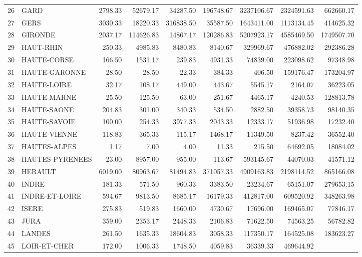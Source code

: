 \documentclass[11pt, a4paper]{article}
\begin{document}
\begin{center}
\begin{table}[ht]
\begin{tabular}{rlrrrrrrr}
  26 & GARD & 2798.33 & 52679.17 & 34287.50 & 196748.67 & 3237106.67 & 2324591.63 
& 662660.17 \\ 
  27 & GERS & 3030.33 & 18220.33 & 316838.50 & 35587.50 & 1643411.00 & 1113134.45 
& 414625.32 \\ 
  28 & GIRONDE & 2037.17 & 114626.83 & 14867.17 & 120286.83 & 5207923.17 & 4585469.50 & 1749507.70 \\ 
  29 & HAUT-RHIN & 250.33 & 4985.83 & 8480.83 & 8140.67 & 329969.67 & 476882.02 & 
292386.28 \\ 
  30 & HAUTE-CORSE & 166.50 & 1531.17 & 239.83 & 4931.33 & 74839.00 & 223098.62 & 
97348.98 \\
  31 & HAUTE-GARONNE & 28.50 & 28.50 & 22.33 & 384.33 & 406.50 & 159176.47 & 173204.97 \\ 
  32 & HAUTE-LOIRE & 32.17 & 108.17 & 449.00 & 443.67 & 5545.17 & 2164.07 & 36223.05 \\
  33 & HAUTE-MARNE & 25.50 & 125.50 & 63.00 & 251.67 & 4465.17 & 4240.53 & 128813.78 \\ 
  34 & HAUTE-SAONE & 204.83 & 301.00 & 340.33 & 534.50 & 2882.50 & 39358.73 & 98140.35 \\ 
  35 & HAUTE-SAVOIE & 100.00 & 254.33 & 3977.33 & 2043.33 & 12333.17 & 51936.98 & 
17232.40 \\ 
  36 & HAUTE-VIENNE & 118.83 & 365.33 & 115.17 & 1468.17 & 11349.50 & 8237.42 & 36552.40 \\
  37 & HAUTES-ALPES & 1.17 & 7.00 & 4.00 & 11.33 & 215.50 & 64692.05 & 18084.02 \\
  38 & HAUTES-PYRENEES & 23.00 & 8957.00 & 955.00 & 113.67 & 593145.67 & 44070.03 
& 41571.12 \\ 
  39 & HERAULT & 6019.00 & 80963.67 & 81494.83 & 371057.33 & 4909163.83 & 2198114.52 & 865166.08 \\ 
  40 & INDRE & 181.33 & 571.50 & 960.33 & 3383.50 & 23234.67 & 65151.07 & 279653.15 \\ 
  41 & INDRE-ET-LOIRE & 594.67 & 9813.50 & 8685.17 & 16179.33 & 412817.00 & 609520.92 & 348263.98 \\
  42 & ISERE & 275.83 & 519.83 & 1660.00 & 4730.67 & 17696.00 & 169465.07 & 77846.17 \\
  43 & JURA & 359.00 & 2353.17 & 2448.33 & 2106.83 & 71622.50 & 74563.25 & 56782.82 \\ 
  44 & LANDES & 261.50 & 1635.33 & 18604.83 & 3058.33 & 117350.17 & 164525.08 & 183623.27 \\ 
  45 & LOIR-ET-CHER & 172.00 & 1006.33 & 1748.50 & 4059.83 & 36339.33 & 469644.92 

\end{tabular}
\end{table}
\end{center}
\end{document}
